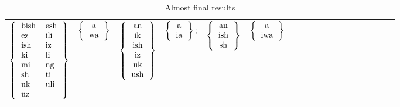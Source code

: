 \documentclass[output=paper,colorlinks,citecolor=brown]{langscibook}
\begin{document}
   
\begin{table}
\begin{tabular}{lllllllllllllllllll} 
$ \left\{ \begin{tabular}{ll} bish &  esh     \\ ez  &  ili \\ ish  & iz \\ki  & li\\mi & ng\\sh  &  ti\\ uk  &  uli \\ uz \end{tabular} \right\} $& $\left\{ \begin{tabular}{c}  a \\ wa \end{tabular} \right\}  $  &
$ \left\{ \begin{tabular}{c}  an     \\ ik \\ ish \\ iz \\ uk \\ush  \end{tabular} \right\} $&$ \left\{ \begin{tabular}{c}  a \\ ia \end{tabular} \right\}   ;$ &
$ \left\{ \begin{tabular}{c}  an     \\ ish \\ sh    \end{tabular} \right\} $& $\left\{ \begin{tabular}{c}  a \\ iwa \end{tabular} \right\} $   \\
\end{tabular}
\caption{Almost final results}
\label{finalsigs1}
\end{table}

\vspace{.2in}
\end{document}
